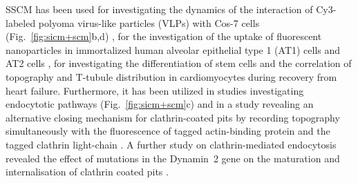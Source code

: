 SSCM has been used for investigating the dynamics of the interaction of
Cy3-labeled polyoma virus-like particles (VLPs) with Cos-7 cells
(Fig.~\ref{fig:sicm+scm}b,d) \cite{Gorelik2002a}, for the investigation of the
uptake of fluorescent nanoparticles in immortalized human alveolar epithelial
type 1 (AT1) cells and AT2 cells \cite{Kemp2008,Novak2014}, for investigating
the differentiation of stem cells \cite{Gorelik2008} and the correlation of
topography and T-tubule distribution in cardiomyocytes \cite{Lyon2012} during
recovery from heart failure. Furthermore, it has been utilized in studies
investigating endocytotic pathways \cite{Shevchuk2008}
(Fig.~\ref{fig:sicm+scm}c) and in a study revealing an alternative closing
mechanism for clathrin-coated pits by recording topography simultaneously with
the fluorescence of tagged actin-binding protein and the tagged clathrin
light-chain \cite{Shevchuk2012}. A further study on clathrin-mediated
endocytosis revealed the effect of mutations in the Dynamin~2 gene on the
maturation and internalisation of clathrin coated pits \cite{Ali2019}.






